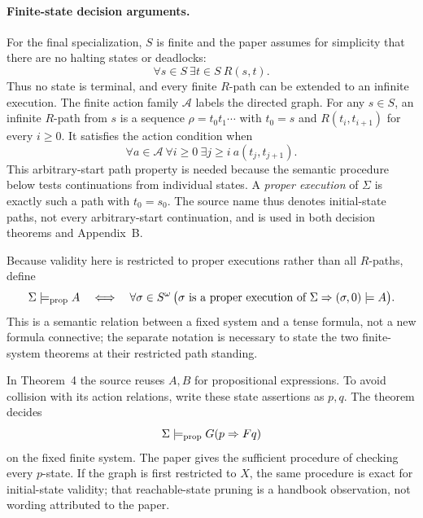 \paragraph{Finite-state decision arguments.}
For the final specialization, \(S\) is finite and the paper assumes for
simplicity that there are no halting states or deadlocks:
\[
 \forall s\in S\ \exists t\in S\ R(s,t).
\]
Thus no state is terminal, and every finite \(R\)-path can be extended to an
infinite execution.  The finite action family \(\mathcal A\) labels the
directed graph.  For any \(s\in S\), an infinite \(R\)-path from \(s\) is a
sequence \(\rho=t_0t_1\cdots\) with \(t_0=s\) and
\(R(t_i,t_{i+1})\) for every \(i\ge0\).  It satisfies the action condition when
\[
 \forall a\in\mathcal A\ \forall i\ge0\
 \exists j\ge i\ a(t_j,t_{j+1}).
\]
This arbitrary-start path property is needed because the semantic procedure
below tests continuations from individual states.  A \emph{proper execution}
of \(\Sigma\) is exactly such a path with \(t_0=s_0\).  The source name thus
denotes initial-state paths, not every arbitrary-start continuation, and is
used in both decision theorems and Appendix~B.

Because validity here is restricted to proper executions rather than all
\(R\)-paths, define
\[
 \Sigma\models_{\rm prop}A
 \quad\Longleftrightarrow\quad
 \forall\sigma\in S^\omega\,
 \bigl(\sigma\text{ is a proper execution of }\Sigma
       \Rightarrow(\sigma,0)\models A\bigr).
\]
This is a semantic relation between a fixed system and a tense formula, not a
new formula connective; the separate notation is necessary to state the two
finite-system theorems at their restricted path standing.

In Theorem~4 the source reuses \(A,B\) for propositional expressions.  To avoid
collision with its action relations, write these state assertions as \(p,q\).
The theorem decides
\[
 \Sigma\models_{\rm prop}G(p\Rightarrow Fq)
\]
on the fixed finite system.  The paper gives the sufficient procedure of
checking every \(p\)-state.  If the graph is first restricted to \(X\), the
same procedure is exact for initial-state validity; that reachable-state
pruning is a handbook observation, not wording attributed to the paper.

